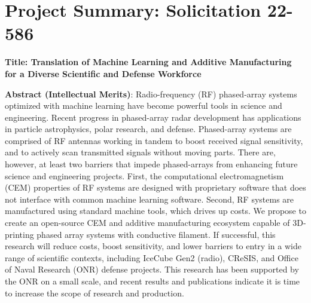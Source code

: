 \documentclass[../../main.tex]{subfiles}
\begin{document}
\section{Project Summary: Solicitation 22-586}

\textbf{Title: Translation of Machine Learning and Additive Manufacturing for a Diverse Scientific and Defense Workforce}

\textbf{Abstract (Intellectual Merits)}: Radio-frequency (RF) phased-array systems optimized with machine learning have become powerful tools in science and engineering.  Recent progress in phased-array radar development has applications in particle astrophysics, polar research, and defense.  Phased-array systems are comprised of RF antennas working in tandem to boost received signal sensitivity, and to actively scan transmitted signals without moving parts.  There are, however, at least two barriers that impede phased-arrays from enhancing future science and engineering projects.  First, the computational electromagnetism (CEM) properties of RF systems are designed with proprietary software that does not interface with common machine learning software.  Second, RF systems are manufactured using standard machine tools, which drives up costs.  We propose to create an open-source CEM and additive manufacturing ecosystem capable of 3D-printing phased array systems with conductive filament.  If successful, this research will reduce costs, boost sensitivity, and lower barriers to entry in a wide range of scientific contexts, including IceCube Gen2 (radio), CReSIS, and Office of Naval Research (ONR) defense projects.  This research has been supported by the ONR on a small scale, and recent results and publications indicate it is time to increase the scope of research and production.
\end{document}
